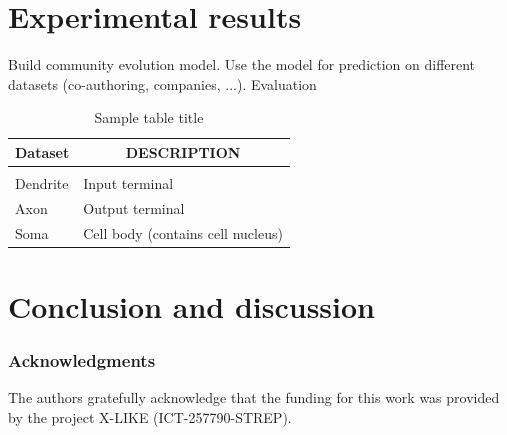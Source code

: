 \documentclass{article} %
\begin{document}
\section{Experimental results}
Build community evolution model.
Use the model for prediction on different datasets (co-authoring, companies, ...). Evaluation

\begin{table}[t]
\caption{Sample table title}
\label{sample-table}
\begin{center}
\begin{tabular}{ll}
\multicolumn{1}{c}{\bf Dataset}  &\multicolumn{1}{c}{\bf DESCRIPTION}
\\ \hline \\
Dendrite         &Input terminal \\
Axon             &Output terminal \\
Soma             &Cell body (contains cell nucleus) \\
\end{tabular}
\end{center}
\end{table}

\section{Conclusion and discussion}

\subsubsection*{Acknowledgments}
   The authors gratefully acknowledge that the funding for this work was provided by the project X-LIKE (ICT-257790-STREP)\cite{xlike}.




\end{document}
